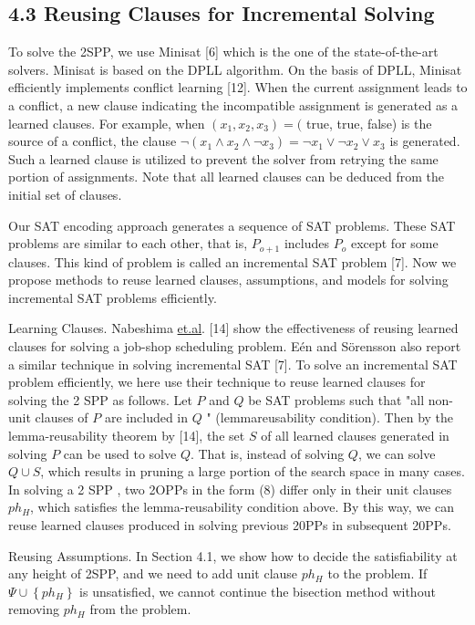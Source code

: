 \documentclass[10pt]{article}
\begin{document}
\subsection*{4.3 Reusing Clauses for Incremental Solving}
To solve the 2SPP, we use Minisat [6] which is the one of the state-of-the-art solvers. Minisat is based on the DPLL algorithm. On the basis of DPLL, Minisat efficiently implements conflict learning [12]. When the current assignment leads to a conflict, a new clause indicating the incompatible assignment is generated as a learned clauses. For example, when $\left(x_{1}, x_{2}, x_{3}\right)=($ true, true, false) is the source of a conflict, the clause $\neg\left(x_{1} \wedge x_{2} \wedge \neg x_{3}\right)=\neg x_{1} \vee \neg x_{2} \vee x_{3}$ is generated. Such a learned clause is utilized to prevent the solver from retrying the same portion of assignments. Note that all learned clauses can be deduced from the initial set of clauses.

Our SAT encoding approach generates a sequence of SAT problems. These SAT problems are similar to each other, that is, $P_{o+1}$ includes $P_{o}$ except for some clauses. This kind of problem is called an incremental SAT problem [7]. Now we propose methods to reuse learned clauses, assumptions, and models for solving incremental SAT problems efficiently.

Learning Clauses. Nabeshima \href{http://et.al}{et.al}. [14] show the effectiveness of reusing learned clauses for solving a job-shop scheduling problem. Eén and Sörensson also report a similar technique in solving incremental SAT [7]. To solve an incremental SAT problem efficiently, we here use their technique to reuse learned clauses for solving the 2 SPP as follows. Let $P$ and $Q$ be SAT problems such that "all non-unit clauses of $P$ are included in $Q$ " (lemmareusability condition). Then by the lemma-reusability theorem by [14], the set $S$ of all learned clauses generated in solving $P$ can be used to solve $Q$. That is, instead of solving $Q$, we can solve $Q \cup S$, which results in pruning a large portion of the search space in many cases. In solving a 2 SPP , two 2OPPs in the form (8) differ only in their unit clauses $p h_{H}$, which satisfies the lemma-reusability condition above. By this way, we can reuse learned clauses produced in solving previous 20PPs in subsequent 20PPs.

Reusing Assumptions. In Section 4.1, we show how to decide the satisfiability at any height of 2SPP, and we need to add unit clause $p h_{H}$ to the problem. If $\Psi \cup\left\{p h_{H}\right\}$ is unsatisfied, we cannot continue the bisection method without removing $p h_{H}$ from the problem.
\end{document}
